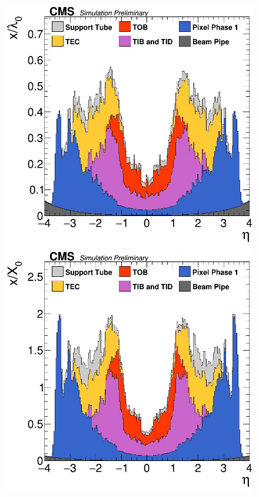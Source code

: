 \begin{figure}[H]
\centering
\begin{minipage}{\linewidth}
    \centering
\begin{minipage}{0.43\linewidth}
        \centering
        \includegraphics[width=\linewidth]{fig/chap03-cms/material_budget_lambda.png}
\end{minipage}
\hfill
\begin{minipage}{0.43\linewidth}
        \centering
        \includegraphics[width=\linewidth]{fig/chap03-cms/material_budget_X.png}

\end{minipage}
\end{minipage}
\end{figure}
